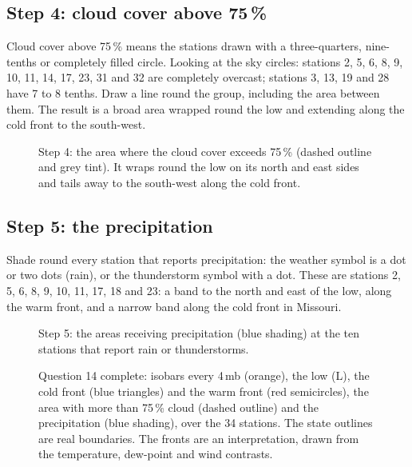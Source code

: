 \subsection{Step 4: cloud cover above 75\,\%}

Cloud cover above 75\,\% means the stations drawn with a three-quarters, nine-tenths or completely filled circle. Looking at the sky circles: stations 2, 5, 6, 8, 9, 10, 11, 14, 17, 23, 31 and 32 are completely overcast; stations 3, 13, 19 and 28 have 7 to 8 tenths. Draw a line round the group, including the area between them. The result is a broad area wrapped round the low and extending along the cold front to the south-west.

\begin{figure}[ht]
\centering
\mapbase{0.0196cm}{}
\caption{Step 4: the area where the cloud cover exceeds 75\,\% (dashed outline and grey tint). It wraps round the low on its north and east sides and tails away to the south-west along the cold front.}
\end{figure}

\subsection{Step 5: the precipitation}

Shade round every station that reports precipitation: the weather symbol is a dot or two dots (rain), or the thunderstorm symbol with a dot. These are stations 2, 5, 6, 8, 9, 10, 11, 17, 18 and 23: a band to the north and east of the low, along the warm front, and a narrow band along the cold front in Missouri.

\begin{figure}[ht]
\centering
\mapbase{0.0196cm}{}
\caption{Step 5: the areas receiving precipitation (blue shading) at the ten stations that report rain or thunderstorms.}
\end{figure}

\begin{landscape}
\begin{figure}[p]
\centering
\mapbase{0.0225cm}{}
\caption{Question 14 complete: isobars every 4\,mb (orange), the low (L), the cold front (blue triangles) and the warm front (red semicircles), the area with more than 75\,\% cloud (dashed outline) and the precipitation (blue shading), over the 34 stations. The state outlines are real boundaries. The fronts are an interpretation, drawn from the temperature, dew-point and wind contrasts.}\label{p3-fig:final}
\end{figure}
\end{landscape}

